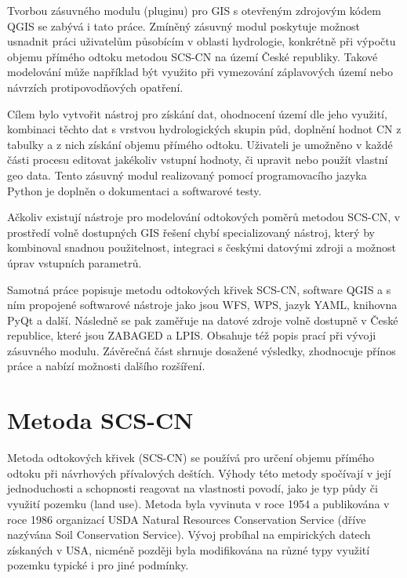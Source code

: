 \documentclass[a4paper,oneside,12pt]{book}
\begin{document}
Tvorbou zásuvného modulu (pluginu) pro GIS s otevřeným zdrojovým kódem QGIS se zabývá i tato práce. Zmíněný zásuvný modul poskytuje možnost usnadnit práci uživatelům působícím v oblasti hydrologie, konkrétně při výpočtu objemu přímého odtoku metodou SCS-CN na území České republiky. Takové modelování může například být využito při vymezování záplavových území nebo návrzích protipovodňových opatření.

Cílem bylo vytvořit nástroj pro získání dat, ohodnocení území dle jeho využití, kombinaci těchto dat s vrstvou hydrologických skupin půd, doplnění hodnot CN z tabulky a z nich získání objemu přímého odtoku. Uživateli je umožněno v každé části procesu editovat jakékoliv vstupní hodnoty, či upravit nebo použít vlastní geo data. Tento zásuvný modul realizovaný pomocí programovacího jazyka Python je doplněn o dokumentaci a softwarové testy. 

Ačkoliv existují nástroje pro modelování odtokových poměrů metodou SCS-CN, v prostředí volně dostupných GIS řešení chybí specializovaný nástroj, který by kombinoval snadnou použitelnost, integraci s českými datovými zdroji a možnost úprav vstupních parametrů.

Samotná práce popisuje metodu odtokových křivek SCS-CN, software QGIS a s ním propojené softwarové nástroje jako jsou WFS, WPS, jazyk YAML, knihovna PyQt a další. Následně se pak zaměřuje na  datové zdroje volně dostupně v České republice, které jsou ZABAGED a LPIS. Obsahuje též popis prací při vývoji zásuvného modulu. Závěrečná část shrnuje dosažené výsledky, zhodnocuje přínos práce a nabízí možnosti dalšího rozšíření.



\newpage
\chapter{Metoda SCS-CN} \label{SCSCN}
\hspace{10mm} Metoda odtokových křivek (SCS-CN) se používá pro určení objemu přímého odtoku při návrhových přívalových deštích. Výhody této metody spočívají v její jednoduchosti a schopnosti reagovat na vlastnosti povodí, jako je typ půdy či využití pozemku (land use). Metoda byla vyvinuta v roce 1954 a publikována v roce 1986 organizací USDA Natural Resources Conservation Service (dříve nazývána Soil Conservation Service). \cite{MNYDGwleJOjKLRUp} Vývoj probíhal na empirických datech získaných v USA, nicméně později byla modifikována na různé typy využití pozemku typické i pro jiné podmínky. \cite{Holman2003}\cite{Lian2020}
\end{document}
